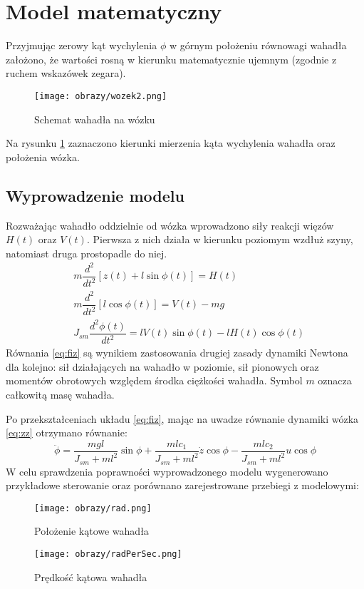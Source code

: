 \section{Model matematyczny}
Przyjmując zerowy kąt wychylenia $\phi$ w górnym położeniu równowagi wahadła założono, że wartości rosną w kierunku matematycznie ujemnym (zgodnie z ruchem wskazówek zegara).  
\begin{figure}[H]
\centering
\label{fig:www}
\texttt{[image: obrazy/wozek2.png]}
\caption{Schemat wahadła na wózku}
\end{figure}
Na rysunku \ref{fig:www} zaznaczono kierunki mierzenia kąta wychylenia wahadła oraz położenia wózka.
\subsection{Wyprowadzenie modelu}
Rozważając wahadło oddzielnie od wózka wprowadzono siły reakcji więzów $H(t)$ oraz $V(t)$. Pierwsza z nich działa w kierunku poziomym wzdłuż szyny, natomiast druga prostopadle do niej.
\begin{equation}
\label{eq:fiz}
\begin{aligned}
&m\dfrac{d^2}{dt^2}[z(t)+l\sin \phi(t)] = H(t)\\
&m\dfrac{d^2}{dt^2}[l\cos \phi(t)] = V(t)-mg\\
&J_{sm}\dfrac{d^2\phi(t)}{dt^2} = lV(t)\sin \phi(t)-lH(t)\cos \phi(t)
\end{aligned}
\end{equation}
Równania \ref{eq:fiz} są wynikiem zastosowania drugiej zasady dynamiki Newtona dla kolejno: sił działających na wahadło w poziomie, sił pionowych oraz momentów obrotowych względem środka ciężkości wahadła. Symbol $m$ oznacza całkowitą masę wahadła.

Po przekształceniach układu \ref{eq:fiz}, mając na uwadze równanie dynamiki wózka \ref{eq:zz} otrzymano równanie:
\begin{equation}
\label{eq:rowNonLin}
\ddot{\phi}=\dfrac{mgl}{J_{sm}+ml^2}\sin\phi+\dfrac{mlc_1}{J_{sm}+ml^2}\dot{z}\cos\phi-\dfrac{mlc_2}{J_{sm}+ml^2}u\cos\phi
\end{equation}
W celu sprawdzenia poprawności wyprowadzonego modelu wygenerowano przykładowe sterowanie oraz porównano zarejestrowane przebiegi z modelowymi:
\begin{figure}[H]
\centering
\label{fig:poW}
\texttt{[image: obrazy/rad.png]}
\caption{Położenie kątowe wahadła}
\end{figure}
\begin{figure}[H]
\centering
\label{fig:prW}
\texttt{[image: obrazy/radPerSec.png]}
\caption{Prędkość kątowa wahadła}
\end{figure}
